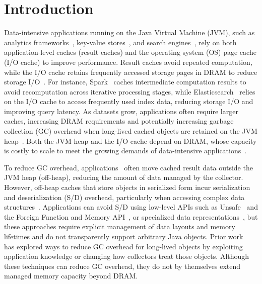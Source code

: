 
\chapter{Introduction}
\label{chapter:intro}

Data-intensive applications running on the Java Virtual Machine (JVM), such as analytics frameworks~\cite{zaharia:spark,giraph}, key-value stores~\cite{lakshman:cassandra,vohra:hbase,santos:infinispan}, and search engines~\cite{mccandless:lucene,elastic_search,solr,opensearch}, rely on both application-level caches (result caches) and the operating system (OS) page cache (I/O cache) to improve performance.
Result caches avoid repeated computation, while the I/O cache retains frequently accessed storage pages in DRAM to reduce storage I/O~\cite{apapag:aquila,apapag:fmap,jmal:hugemap,guanyu:tricache,huang:flashmap}.
For instance, Spark~\cite{zaharia:spark} caches intermediate computation results to avoid recomputation across iterative processing stages, while Elasticsearch~\cite{elastic_search} relies on the I/O cache to access frequently used index data, reducing storage I/O and improving query latency.
As datasets grow, applications often require larger caches, increasing DRAM requirements and potentially increasing garbage collection (GC) overhead when long-lived cached objects are retained on the JVM heap~\cite{mitchel:bloat,teraheap}.
Both the JVM heap and the I/O cache depend on DRAM, whose capacity is costly to scale to meet the growing demands of data-intensive applications~\cite{damon,zombieland,tirmazi:borg,weiner:tmo}.

To reduce GC overhead, applications~\cite{lakshman:cassandra,vohra:hbase,zaharia:spark} often move cached result data outside the JVM heap (off-heap), reducing the amount of data managed by the collector.
However, off-heap caches that store objects in serialized form incur serialization and deserialization (S/D) overhead, particularly when accessing complex data structures~\cite{ibanez:zerializer,matei:champions,nguyen:skyway}.
Applications can avoid S/D using low-level APIs such as Unsafe~\cite{jep471} and the Foreign Function and Memory API~\cite{jep454}, or specialized data representations~\cite{arrow,spark_tungsten}, but these approaches require explicit management of data layouts and memory lifetimes and do not transparently support arbitrary Java objects.
Prior work~\cite{wang:bridgegc,khanh:yak,gog:broom,lu:deca,bruno:n2gc} has explored ways to reduce GC overhead for long-lived objects by exploiting application knowledge or changing how collectors treat those objects.
Although these techniques can reduce GC overhead, they do not by themselves extend managed memory capacity beyond DRAM.

